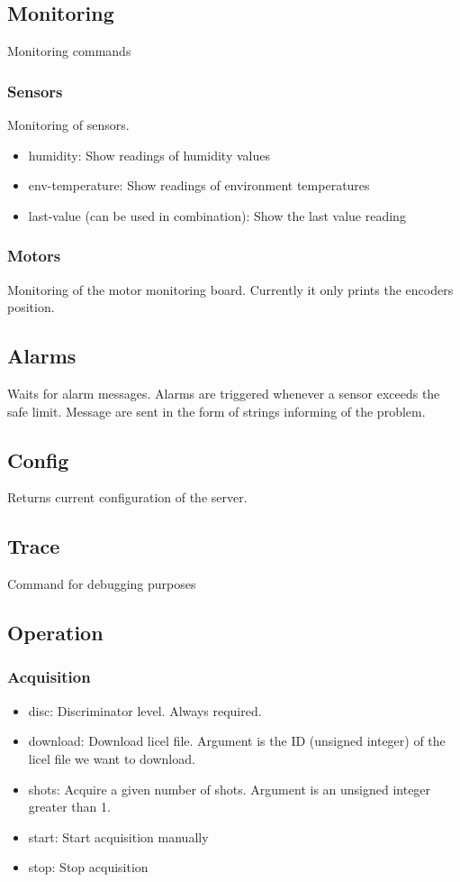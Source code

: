\documentclass[letterpaper, 10 pt]{article}
\begin{document}
\subsection{Monitoring}
Monitoring commands
\subsubsection{Sensors}
Monitoring of sensors. 
\begin{itemize}
	\item humidity: Show readings of humidity values 
	\item env-temperature: Show readings of environment temperatures
	\item last-value (can be used in combination): Show the last value reading
\end{itemize}
\subsubsection{Motors}
Monitoring of the motor monitoring board. Currently it only prints the encoders position.

\subsection{Alarms}
Waits for alarm messages. Alarms are triggered whenever a sensor exceeds the safe limit. Message are sent in the form of strings informing of the problem.

\subsection{Config}
Returns current configuration of the server.

\subsection{Trace}
Command for debugging purposes

\subsection{Operation}
\subsubsection{Acquisition}
\begin{itemize}
	\item disc: Discriminator level. Always required.
	\item download: Download licel file. Argument is the ID (unsigned integer) of the licel file we want to download.
	\item shots: Acquire a given number of shots. Argument is an unsigned integer greater than 1. 
	\item start: Start acquisition manually
	\item stop: Stop acquisition
\end{itemize}
\end{document}
